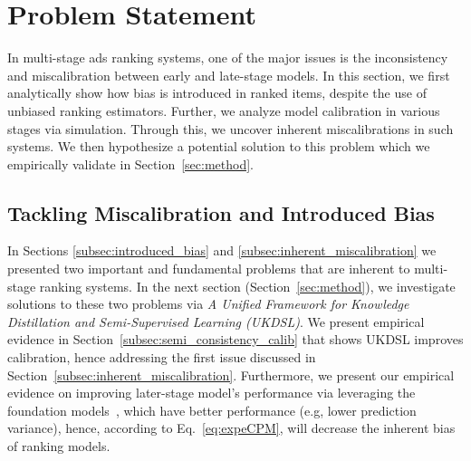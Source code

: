 \section{Problem Statement}
\label{sec:problem}

In multi-stage ads ranking systems, one of the major issues is the inconsistency and miscalibration between early and late-stage models.
In this section, we first analytically show how bias is introduced in ranked items, despite the use of unbiased ranking estimators.
Further, we analyze model calibration in various stages via simulation.
Through this, we uncover inherent miscalibrations in such systems.
We then hypothesize a potential solution to this problem which we empirically validate in Section~\ref{sec:method}.






\subsection{Tackling Miscalibration and Introduced Bias}
In Sections \ref{subsec:introduced_bias} and  \ref{subsec:inherent_miscalibration} we presented two important and fundamental problems that are inherent to multi-stage ranking systems.
In the next section (Section~\ref{sec:method}), we investigate solutions to these two problems via \textit{A Unified Framework for Knowledge Distillation and Semi-Supervised Learning (UKDSL)}.
We present empirical evidence in Section~\ref{subsec:semi_consistency_calib} that shows UKDSL improves calibration, hence addressing the first issue discussed in Section~\ref{subsec:inherent_miscalibration}.
Furthermore, we present our empirical evidence on improving later-stage model's performance via leveraging the foundation models~\cite{bommasani2021opportunities}, which have better performance (e.g, lower prediction variance), hence, according to Eq.~\ref{eq:expeCPM}, will decrease the inherent bias of ranking models.

